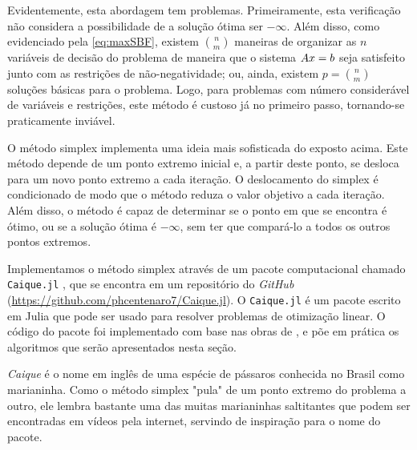 Evidentemente, esta abordagem tem problemas. Primeiramente, esta verificação não considera a possibilidade de a solução ótima ser $-\infty$. Além disso, como evidenciado pela \cref{eq:maxSBF}, existem $\binom{n}{m}$ maneiras de organizar as $n$ variáveis de decisão do problema de maneira que o sistema $Ax = b$ seja satisfeito junto com as restrições de não-negatividade; ou, ainda, existem $p = \binom{n}{m}$ soluções básicas para o problema. Logo, para problemas com número considerável de variáveis e restrições, este método é custoso já no primeiro passo, tornando-se praticamente inviável.

O método simplex implementa uma ideia mais sofisticada do exposto acima. Este método depende de um ponto extremo inicial e, a partir deste ponto, se desloca para um novo ponto extremo a cada iteração. O deslocamento do simplex é condicionado de modo que o método reduza o valor objetivo a cada iteração. Além disso, o método é capaz de determinar se o ponto em que se encontra é ótimo, ou se a solução ótima é $-\infty$, sem ter que compará-lo a todos os outros pontos extremos.

Implementamos o método simplex através de um pacote computacional chamado \texttt{Caique.jl} \cite{Centenaro:23}, que se encontra em um repositório do \emph{GitHub} (\url{https://github.com/phcentenaro7/Caique.jl}). O \texttt{Caique.jl} é um pacote escrito em Julia \cite{JULIA} que pode ser usado para resolver problemas de otimização linear. O código do pacote foi implementado com base nas obras de \textcite{BAZARAA:10,BERTSIMAS:97}, e põe em prática os algoritmos que serão apresentados nesta seção.

\emph{Caique} é o nome em inglês de uma espécie de pássaros conhecida no Brasil como marianinha. Como o método simplex "pula" de um ponto extremo do problema a outro, ele lembra bastante uma das muitas marianinhas saltitantes que podem ser encontradas em vídeos pela internet, servindo de inspiração para o nome do pacote.


